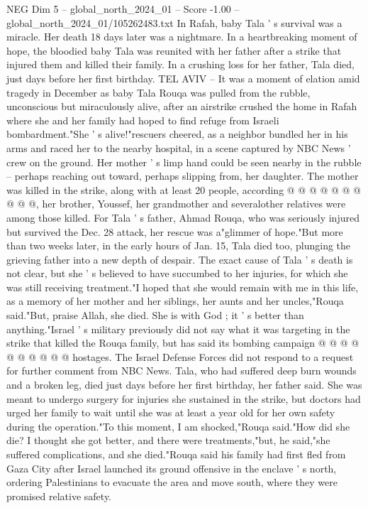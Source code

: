 \begin{textsample}{NEG Dim 5 – global\_north\_2024\_01 – Score -1.00 – global\_north\_2024\_01/105262483.txt}  \label{ex:f5_neg_342}
In Rafah, baby Tala ' s survival was a miracle.
Her death 18 days later was a nightmare.
In a heartbreaking moment of hope, the bloodied baby Tala was reunited with her father after a strike that injured them and killed their family.
In a crushing loss for her father, Tala died, just days before her first birthday.
TEL AVIV -- It was a moment of elation amid tragedy in December as baby Tala Rouqa was pulled from the rubble, unconscious but miraculously alive, after an airstrike crushed the home in Rafah where she and her family had hoped to find refuge from Israeli bombardment."She ' s alive!"rescuers cheered, as a neighbor bundled her in his arms and raced her to the nearby hospital, in a scene captured by NBC News ' crew on the ground.
Her mother ' s limp hand could be seen nearby in the rubble -- perhaps reaching out toward, perhaps slipping from, her daughter.
The mother was killed in the strike, along with at least 20 people, according @ @ @ @ @ @ @ @ @ @, her brother, Youssef, her grandmother and severalother relatives were among those killed.
For Tala ' s father, Ahmad Rouqa, who was seriously injured but survived the Dec. 28 attack, her rescue was a"glimmer of hope."But more than two weeks later, in the early hours of Jan. 15, Tala died too, plunging the grieving father into a new depth of despair.
The exact cause of Tala ' s death is not clear, but she ' s believed to have succumbed to her injuries, for which she was still receiving treatment."I hoped that she would remain with me in this life, as a memory of her mother and her siblings, her aunts and her uncles,"Rouqa said."But, praise Allah, she died.
She is with God ; it ' s better than anything."Israel ' s military previously did not say what it was targeting in the strike that killed the Rouqa family, but has said its bombing campaign @ @ @ @ @ @ @ @ @ @ hostages.
The Israel Defense Forces did not respond to a request for further comment from NBC News.
Tala, who had suffered deep burn wounds and a broken leg, died just days before her first birthday, her father said.
She was meant to undergo surgery for injuries she sustained in the strike, but doctors had urged her family to wait until she was at least a year old for her own safety during the operation."To this moment, I am shocked,"Rouqa said."How did she die?
I thought she got better, and there were treatments,"but, he said,"she suffered complications, and she died."Rouqa said his family had first fled from Gaza City after Israel launched its ground offensive in the enclave ' s north, ordering Palestinians to evacuate the area and move south, where they were promised relative safety.

\end{textsample}
